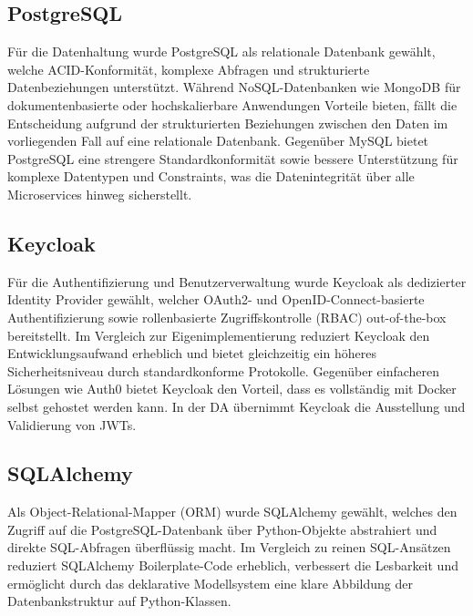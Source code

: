 \newpage

\subsection{PostgreSQL}

Für die Datenhaltung wurde PostgreSQL als relationale Datenbank gewählt, 
welche ACID-Konformität, komplexe Abfragen und strukturierte 
Datenbeziehungen unterstützt.\cite{postgresql}
Während NoSQL-Datenbanken wie MongoDB für dokumentenbasierte oder 
hochskalierbare Anwendungen Vorteile bieten, fällt die Entscheidung aufgrund der strukturierten Beziehungen 
zwischen den Daten im vorliegenden Fall auf eine relationale Datenbank.
Gegenüber MySQL bietet PostgreSQL eine strengere Standardkonformität 
sowie bessere Unterstützung für komplexe Datentypen und Constraints, 
was die Datenintegrität über alle Microservices hinweg sicherstellt.

\subsection{Keycloak}

Für die Authentifizierung und Benutzerverwaltung wurde Keycloak als 
dedizierter Identity Provider gewählt, welcher OAuth2- und 
OpenID-Connect-basierte Authentifizierung sowie rollenbasierte 
Zugriffskontrolle (RBAC) out-of-the-box bereitstellt.\cite{keycloak}
Im Vergleich zur Eigenimplementierung reduziert Keycloak den Entwicklungsaufwand erheblich und bietet 
gleichzeitig ein höheres Sicherheitsniveau durch standardkonforme Protokolle.
Gegenüber einfacheren Lösungen wie Auth0 bietet Keycloak den Vorteil, dass es
vollständig mit Docker selbst gehostet werden kann. 
In der \gls{DA} übernimmt Keycloak die Ausstellung und Validierung 
von \gls{JWT}s.

\subsection{SQLAlchemy}

Als Object-Relational-Mapper (ORM) wurde SQLAlchemy gewählt, welches 
den Zugriff auf die PostgreSQL-Datenbank über Python-Objekte abstrahiert 
und direkte \gls{SQL}-Abfragen überflüssig macht.\cite{sqlalchemy}
Im Vergleich zu reinen \gls{SQL}-Ansätzen reduziert SQLAlchemy Boilerplate-Code 
erheblich, verbessert die Lesbarkeit und ermöglicht durch das deklarative 
Modellsystem eine klare Abbildung der Datenbankstruktur auf Python-Klassen.

\newpage

